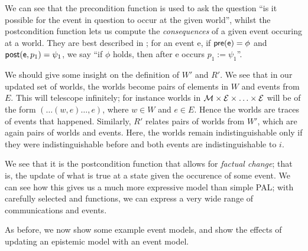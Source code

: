 \documentclass[10pt, a4paper]{report}
\begin{document}
We can see that the precondition function is used to ask the question ``is it
possible for the event in question to occur at the given world'', whilst the
postcondition function lets us compute the \emph{consequences} of a given event
occuring at a world. They are best described in \cite{Prisoners}; for an event
\textsf{e}, if $\textsf{pre}(\textsf{e}) = \phi$ and $\textsf{post}(\textsf{e}, p_1) = \psi_1$,
we say ``if $\phi$ holds, then after \textsf{e} occurs $p_1 := \psi_1$''.

We should give some insight on the definition of $W'$ and $R'$. We see that in
our updated set of worlds, the worlds become pairs of elements in $W$ and events
from $E$. This will telescope infinitely; for instance worlds in $\mathcal{M} \times
\mathcal{E} \times \ldots \times \mathcal{E}$ will be of the form $(\ldots (w ,e) \ldots, e)$, where
$w \in W$ and $e \in E$. Hence the worlds are traces of events that happened.
Similarly, $R'$ relates pairs of worlds from $W'$, which are again pairs of
worlds and events. Here, the worlds remain indistinguishable only if they were
indistinguishable before and both events are indistinguishable to $i$.

We see that it is the postcondition function that allows for \emph{factual
  change}; that is, the update of what is true at a state given the occurence of
some event. We can see how this gives us a much more expressive model than
simple PAL; with carefully selected \tpre and \tpost functions, we can express a
very wide range of communications and events. 

As before, we now show some example event models, and show the effects of
updating an epistemic model with an event model.
\end{document}
